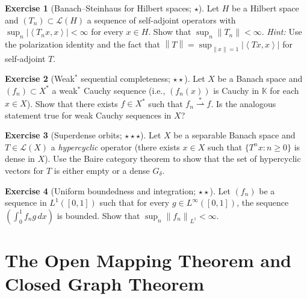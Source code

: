 \documentclass[a4paper,12pt]{book}
\newcommand{\K}{\mathbb{K}}
\newcommand{\norm}[1]{\left\| #1 \right\|}
\newcommand{\abs}[1]{\left| #1 \right|}
\newcommand{\inner}[2]{\left\langle #1, #2 \right\rangle}
\newcommand{\weakstarto}{\overset{*}{\rightharpoonup}}
\theoremstyle{definition}
\newtheorem{exercise}{Exercise}[chapter]
\theoremstyle{plain}
\theoremstyle{remark}
\begin{document}
\begin{exercise}[Banach--Steinhaus for Hilbert spaces; $\star$]\label{ex:bs-hilbert}
Let $H$ be a Hilbert space and $(T_n) \subset \mathcal{L}(H)$ a sequence of
self-adjoint operators with $\sup_n \abs{\inner{T_n x}{x}} < \infty$ for every
$x \in H$. Show that $\sup_n \norm{T_n} < \infty$. \textit{Hint:} Use the
polarization identity and the fact that $\norm{T} = \sup_{\norm{x}=1}
\abs{\inner{Tx}{x}}$ for self-adjoint $T$.
\end{exercise}

\begin{exercise}[Weak$^*$ sequential completeness; $\star\star$]\label{ex:weakstar-complete}
Let $X$ be a Banach space and $(f_n) \subset X^*$ a weak$^*$ Cauchy sequence (i.e.,
$(f_n(x))$ is Cauchy in $\K$ for each $x \in X$). Show that there exists $f \in X^*$
such that $f_n \weakstarto f$. Is the analogous statement true for weak Cauchy
sequences in $X$?
\end{exercise}

\begin{exercise}[Superdense orbits; $\star\star\star$]\label{ex:superdense}
Let $X$ be a separable Banach space and $T \in \mathcal{L}(X)$ a
\emph{hypercyclic} operator (there exists $x \in X$ such
that $\{T^n x : n \geq 0\}$ is dense in $X$). Use the Baire category theorem to
show that the set of hypercyclic vectors for $T$ is either empty or a dense $G_\delta$.
\end{exercise}

\begin{exercise}[Uniform boundedness and integration; $\star\star$]%
\label{ex:ubp-integration}
Let $(f_n)$ be a sequence in $L^1([0,1])$ such that for every $g \in L^\infty([0,1])$,
the sequence $\left(\int_0^1 f_n g\, dx\right)$ is bounded. Show that
$\sup_n \norm{f_n}_{L^1} < \infty$.
\end{exercise}


\chapter{The Open Mapping Theorem and Closed Graph Theorem}\label{ch:omt-cgt}
\minitoc
\end{document}
